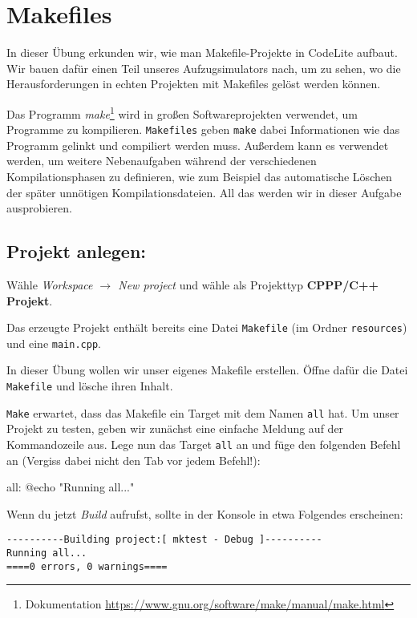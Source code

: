 \section{\ExercisePrefixAdvanced Makefiles}

In dieser Übung erkunden wir, wie man Makefile-Projekte in CodeLite aufbaut.
Wir bauen dafür einen Teil unseres Aufzugsimulators nach, um zu sehen, wo die Herausforderungen in echten Projekten mit Makefiles gelöst werden können.

Das Programm \emph{make}\footnote{Dokumentation \url{https://www.gnu.org/software/make/manual/make.html}} wird in großen Softwareprojekten verwendet, um Programme zu kompilieren.
\texttt{Makefiles} geben \texttt{make} dabei Informationen wie das Programm gelinkt und compiliert werden muss.
Außerdem kann es verwendet werden, um weitere Nebenaufgaben während der verschiedenen Kompilationsphasen zu definieren, wie zum Beispiel das automatische Löschen der später unnötigen Kompilationsdateien.
All das werden wir in dieser Aufgabe ausprobieren.

\subsection{Projekt anlegen:}
Wähle \emph{Workspace $\to$ New project} und wähle als Projekttyp \textbf{CPPP/C++ Projekt}.

Das erzeugte Projekt enthält bereits eine Datei \texttt{Makefile} (im Ordner \texttt{resources}) und eine \texttt{main.cpp}.

In dieser Übung wollen wir unser eigenes Makefile erstellen. Öffne dafür die Datei \texttt{Makefile} und lösche ihren Inhalt. 

\texttt{Make} erwartet, dass das Makefile ein Target mit dem Namen \lstinline{all} hat.
Um unser Projekt zu testen, geben wir zunächst eine einfache Meldung auf der Kommandozeile aus.
Lege nun das Target \lstinline{all} an und füge den folgenden Befehl an (Vergiss dabei nicht den Tab vor jedem Befehl!):

\begin{lstmake}
all:
    @echo "Running all..."
\end{lstmake}

Wenn du jetzt \emph{Build} aufrufst, sollte in der Konsole in etwa Folgendes erscheinen:
\begin{verbatim}
----------Building project:[ mktest - Debug ]----------
Running all...
====0 errors, 0 warnings====

\end{verbatim}

